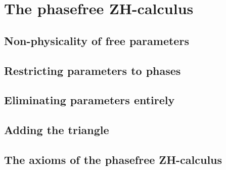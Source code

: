\chapter{The phasefree ZH-calculus}\label{chap:phasefree}
\section{Non-physicality of free parameters}
\section{Restricting parameters to phases}
\section{Eliminating parameters entirely}
\section{Adding the triangle}
\section{The axioms of the phasefree ZH-calculus}
